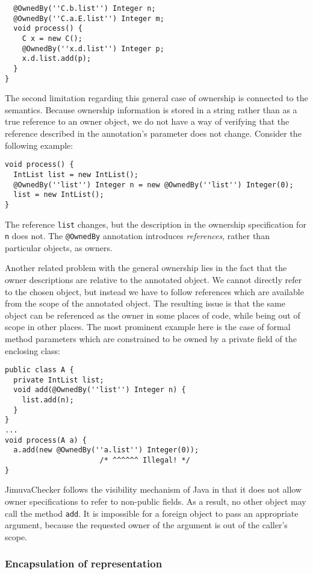 \documentclass{pracamgr}
\theoremstyle{break}
\theoremstyle{break}
\theoremstyle{break}
\begin{document}
\begin{itemize}
\begin{lstlisting}
  @OwnedBy(''C.b.list'') Integer n;   
  @OwnedBy(''C.a.E.list'') Integer m; 
  void process() {
    C x = new C();
    @OwnedBy(''x.d.list'') Integer p;
    x.d.list.add(p);
  }  
}
  \end{lstlisting}
\end{itemize}

The second limitation regarding this general case of ownership is
connected to the semantics. Because ownership information is stored in
a string rather than as a true reference to an owner object, we do not
have a way of verifying that the reference described in the
annotation's parameter does not change. Consider the following
example:
\begin{lstlisting}
void process() {
  IntList list = new IntList();
  @OwnedBy(''list'') Integer n = new @OwnedBy(''list'') Integer(0);
  list = new IntList();
}
\end{lstlisting}
The reference \texttt{list} changes, but the description in the
ownership specification for \texttt{n} does not. The \texttt{@OwnedBy}
annotation introduces \emph{references}, rather than particular
objects, as owners.

Another related problem with the general ownership lies in the fact
that the owner descriptions are relative to the annotated object. We
cannot directly refer to the chosen object, but instead we have to
follow references which are available from the scope of the annotated
object. The resulting issue is that the same object can be referenced
as the owner in some places of code, while being out of scope in other
places. The most prominent example here is the case of formal method
parameters which are constrained to be owned by a private field of the
enclosing class:
\begin{lstlisting}
public class A {
  private IntList list;
  void add(@OwnedBy(''list'') Integer n) {
    list.add(n);
  }
}
...
void process(A a) {
  a.add(new @OwnedBy(''a.list'') Integer(0)); 
                      /* ^^^^^^ Illegal! */
}
\end{lstlisting}
JimuvaChecker follows the visibility mechanism of Java in that it does
not allow owner specifications to refer to non-public fields.  As a
result, no other object may call the method \texttt{add}. It is
impossible for a foreign object to pass an appropriate argument,
because the requested owner of the argument is out of the caller's
scope.

\subsubsection{Encapsulation of representation}
\end{document}
